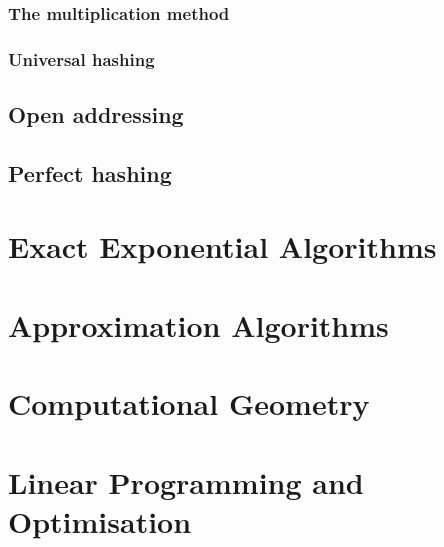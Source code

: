 \documentclass[12pt,a4paper]{article}
\begin{document}
\subsubsection{The multiplication method}
\subsubsection{Universal hashing}
\subsection{Open addressing}
\subsection{Perfect hashing}
\newpage

\section{Exact Exponential Algorithms}
\newpage

\section{Approximation Algorithms}
\newpage

\section{Computational Geometry}
\newpage

\section{Linear Programming and Optimisation}

\end{document}
